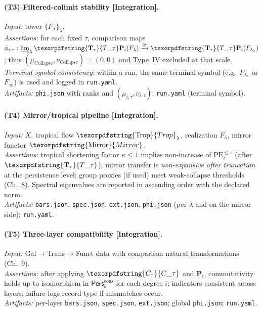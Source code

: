 \documentclass[11pt]{article}
\numberwithin{equation}{section}
\theoremstyle{plain}
\theoremstyle{definition}
\theoremstyle{remark}
\DeclareRobustCommand{\hyp}{\nobreakdash-}
\newcommand{\Pers}{\mathsf{Pers}}
\theoremstyle{plain}
\theoremstyle{definition}
\numberwithin{equation}{section}
\theoremstyle{definition}
\DeclareRobustCommand{\Perskft}{\Pers^{\mathrm{cons}}_{k}}
\DeclareRobustCommand{\Ttau}{\texorpdfstring{\ensuremath{\mathbf{T}_{\tau}}}{T\_\tau}}
\DeclareRobustCommand{\Ctau}{\texorpdfstring{\ensuremath{C_{\tau}}}{C\_\tau}}
\DeclareRobustCommand{\muc}{\mu_{\mathrm{Collapse}}}
\DeclareRobustCommand{\nuc}{\nu_{\mathrm{Collapse}}}
\DeclareRobustCommand{\Trop}{\texorpdfstring{\ensuremath{\operatorname{Trop}}}{Trop}}
\DeclareRobustCommand{\Mirror}{\texorpdfstring{\ensuremath{\operatorname{Mirror}}}{Mirror}}
\numberwithin{equation}{section}
\theoremstyle{plain}
\theoremstyle{definition}
\theoremstyle{remark}
\providecommand{\Cfun}[1]{\mathsf{C}_{#1}}
\providecommand{\Tfun}[1]{\mathbf{T}_{#1}}
\providecommand{\Ctau}{\Cfun{\tau}}
\providecommand{\Ttau}{\Tfun{\tau}}
\providecommand{\muc}{\mu_{\mathrm{Collapse}}}
\providecommand{\nuc}{\nu_{\mathrm{Collapse}}}
\providecommand{\n}{\unskip\space}
\begin{document}
\paragraph{(T3) Filtered\hyp colimit stability [Integration].}
\emph{Input:} tower \(\{F_\lambda\}_\lambda\).\\\n\emph{Assertions:} for each fixed \(\tau\), comparison maps \(\phi_{i,\tau}:\varinjlim_\lambda \Ttau\mathbf{P}_i(F_\lambda)\xrightarrow{\cong}\Ttau\mathbf{P}_i(F_{\lambda_\ast})\); thus \((\muc,\nuc)=(0,0)\) and Type~IV excluded at that scale. \emph{Terminal symbol consistency:} within a run, the same terminal symbol (e.g.\ \(F_{\lambda_\ast}\) or \(F_\infty\)) is used and logged in \texttt{run.yaml}.\\\n\emph{Artifacts:} \texttt{phi.json} with ranks and \((\mu_{i,\tau},\nu_{i,\tau})\); \texttt{run.yaml} (terminal symbol).

\paragraph{(T4) Mirror/tropical pipeline [Integration].}
\emph{Input:} \(X\), tropical flow \(\Trop_\lambda\), realization \(F_\lambda\), mirror functor \(\Mirror\).\\\n\emph{Assertions:} tropical shortening factor \(\kappa\le 1\) implies non\hyp increase of \(\mathrm{PE}^{\le\tau}_i\) (after \(\Ttau\)); mirror transfer is \emph{non\hyp expansive after truncation} at the persistence level; group proxies (if used) meet weak\hyp collapse thresholds (Ch.~8). Spectral eigenvalues are reported in ascending order with the declared norm.\\\n\emph{Artifacts:} \texttt{bars.json}, \texttt{spec.json}, \texttt{ext.json}, \texttt{phi.json} (per \(\lambda\) and on the mirror side); \texttt{run.yaml}.

\paragraph{(T5) Three\hyp layer compatibility [Integration].}
\emph{Input:} Gal\(\to\)Trans\(\to\)Funct data with comparison natural transformations (Ch.~9).\\\n\emph{Assertions:} after applying \(\Ctau\) and \(\mathbf{P}_i\), commutativity holds up to isomorphism in \(\Perskft\) for each degree \(i\); indicators consistent across layers; failure logs record type if mismatches occur.\\\n\emph{Artifacts:} per\hyp layer \texttt{bars.json}, \texttt{spec.json}, \texttt{ext.json}; global \texttt{phi.json}; \texttt{run.yaml}.
\end{document}
